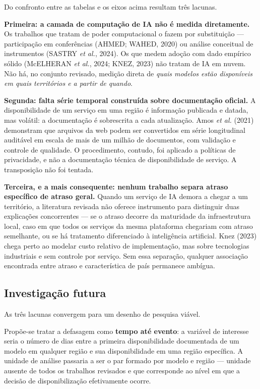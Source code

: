 \documentclass[12pt,a4paper]{article}
\begin{document}
Do confronto entre as tabelas e os eixos acima resultam três lacunas.

\textbf{Primeira: a camada de computação de IA não é medida diretamente.} Os trabalhos
que tratam de poder computacional o fazem por substituição --- participação em
conferências (AHMED; WAHED, 2020) ou análise conceitual de instrumentos
(SASTRY \textit{et al.}, 2024). Os que medem adoção com dado empírico sólido
(McELHERAN \textit{et al.}, 2024; KNEZ, 2023) não tratam de IA em nuvem. Não há, no conjunto revisado,
medição direta de \emph{quais modelos estão disponíveis em quais territórios e a
partir de quando}.

\textbf{Segunda: falta série temporal construída sobre documentação oficial.} A
disponibilidade de um serviço em uma região é informação publicada e datada, mas
volátil: a documentação é sobrescrita a cada atualização. Amos \textit{et al.} (2021)
demonstram que arquivos da web podem ser convertidos em série longitudinal auditável
em escala de mais de um milhão de documentos, com validação e controle de qualidade.
O procedimento, contudo, foi aplicado a políticas de privacidade, e não a documentação
técnica de disponibilidade de serviço. A transposição não foi tentada.

\textbf{Terceira, e a mais consequente: nenhum trabalho separa atraso específico de
atraso geral.} Quando um serviço de IA demora a chegar a um território, a literatura
revisada não oferece instrumento para distinguir duas explicações concorrentes --- se o
atraso decorre da maturidade da infraestrutura local, caso em que todos os serviços da
mesma plataforma chegariam com atraso semelhante, ou se há tratamento diferenciado à
inteligência artificial. Knez (2023) chega perto ao modelar custo relativo de
implementação, mas sobre tecnologias industriais e sem controle por serviço.
Sem essa separação, qualquer associação encontrada entre atraso e característica de
país permanece ambígua.

\subsection{Investigação futura}

As três lacunas convergem para um desenho de pesquisa viável.

Propõe-se tratar a defasagem como \textbf{tempo até evento}: a variável de interesse
seria o número de dias entre a primeira disponibilidade documentada de um modelo em
qualquer região e sua disponibilidade em uma região específica. A unidade de análise
passaria a ser o par formado por modelo e região --- unidade ausente de todos os
trabalhos revisados e que corresponde ao nível em que a decisão de disponibilização
efetivamente ocorre.
\end{document}
